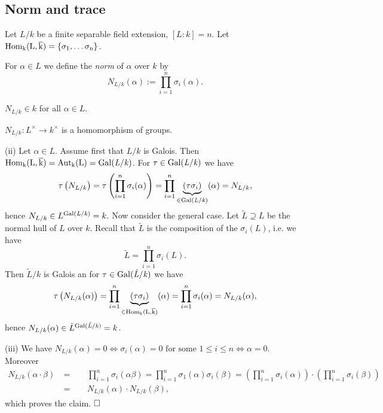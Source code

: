 \documentclass[11pt]{book}
\theoremstyle{nonumberbreak}
\newenvironment{pr}[1][]{\ifthenelse{\equal{#1}{}}{\proof}{\proof[#1]}\rm}{\endproof}
\newenvironment{definbem}[1][]{\ifthenelse{\equal{#1}{}}{\definibem}{\definibem[#1]}\rm}{\enddefinibem}
\begin{document}
\begin{spacing}{1.3}

\renewcommand*\thesection{§ \arabic{section}\quad}
\section{Norm and trace}
\renewcommand*\thesection{\arabic{section}}


\newcommand{\tr}{\rm{tr}\it}

\begin{definbem} %
Let $L/k$ be a finite separable field extension, $[L:k]=n$. Let $\rm{Hom}_{k}(L,\overline{k})=\{\sigma_1, \dots \sigma_n\}$.
\begin{compactenum}
\item For $\alpha \in L$ we define the \textit{norm} of $\alpha$ over $k$ by
$$N_{L/k}(\alpha):=\prod_{i=1}^n \sigma_i(\alpha).$$
\item $N_{L/k} \in k$ for all $\alpha \in L$.
\item $N_{L/k}: L^{\times} \longrightarrow k^{\times}$ is a homomorphism of groups.
\end{compactenum}
\begin{pr}
\begin{compactenum}
\item[(ii)] Let $\alpha \in L$.
Assume first that $L/k$ is Galois. Then $\rm{Hom}_{k}(L,\overline{k})=\rm{Aut}_{k}(L)=\rm{Gal}\it(L/k)$.
For $\tau \in \rm{Gal}\it(L/k)$ we have
$$\tau\left(N_{L/k}\right)=\tau \left( \prod_{i=1}^n \sigma_i(\alpha) \right) = \prod_{i=1}^n \underbrace{(\tau \sigma_i)}_{\in \rm{Gal}\it(L/k)}(\alpha)=N_{L/k},$$
hence $N_{L/k} \in L^{\rm{Gal}\it(L/k)} = k$.
Now consider the general case. Let $\tilde{L} \supseteq L$ be the normal hull of $L$ over $k$.  Recall that $\tilde{L}$ is the composition of the $\sigma_i(L)$, i.e. we have $$\tilde{L}=\prod_{i=1}^n \sigma_i(L).$$Then $\tilde{L}/k$ is Galois an for $\tau \in \rm{Gal}\it(\tilde{L}/k)$ we have
$$\tau\left(N_{L/k}(\alpha)\right)=\prod_{i=1}^n \underbrace{(\tau \sigma_i)}_{\in \rm{Hom}_{k}(L,\overline{k})}(\alpha)=\prod_{i=1}^n \sigma_i(\alpha)=N_{L/k}(\alpha),$$
hence $N_{L/k}(\alpha) \in \tilde{L}^{\rm{Gal}\it(\tilde{L}/k)}=k$.
\item[(iii)] We have $N_{L/k}(\alpha)=0 \Longleftrightarrow \sigma_i(\alpha)=0 \textrm{ for some } 1\leqslant i \leqslant n \Leftrightarrow \alpha=0$.\\
Moreover
\begin{alignat*}{5}
N_{L/k}(\alpha \cdot \beta)\ &=&& \ \ \prod_{i=1}^n \sigma_i(\alpha \beta)=\prod_{i=1}^n \sigma_1(\alpha) \sigma_i(\beta)=\left(\prod_{i=1}^n \sigma_i(\alpha)\right) \cdot \left(\prod_{i=1}^n \sigma_i(\beta)\right)\\
&=&& \ \ N_{L/k}(\alpha) \cdot N_{L/k}(\beta),
\end{alignat*}
which proves the claim. $\hfill \Box$


\end{compactenum}
\end{pr}
\end{definbem}
\end{spacing}
\end{document}
